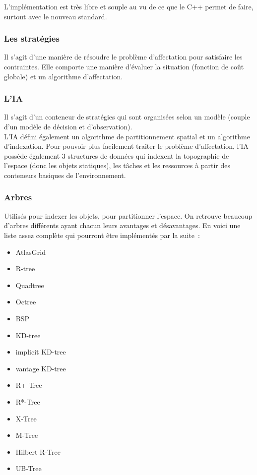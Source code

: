 L'implémentation est très libre et souple au vu de ce que le C++ permet de faire, surtout avec le nouveau standard.

\subsubsection*{Les stratégies}

Il s'agit d'une manière de résoudre le problème d'affectation pour satisfaire les contraintes. Elle comporte une manière d'évaluer la situation (fonction de coût globale) et un algorithme d'affectation.

\subsubsection*{L'IA}

Il s'agit d'un conteneur de stratégies qui sont organisées selon un modèle (couple d'un modèle de décision et d'observation).\\
L'IA défini également un algorithme de partitionnement spatial et un algorithme d'indexation.
Pour pouvoir plus facilement traiter le problème d'affectation, l'IA possède également 3 structures de données qui indexent la topographie de l'espace (donc les objets statiques), les tâches et les ressources à partir des conteneurs basiques de l'environnement.

\subsubsection*{Arbres}

Utilisés pour indexer les objets, pour partitionner l'espace. On retrouve beaucoup d'arbres différents ayant chacun leurs avantages et désavantages. En voici une liste assez complète qui pourront être implémentés par la suite~:
\begin{itemize}
\item AtlasGrid
\item R-tree
\item Quadtree
\item Octree
\item BSP
\item KD-tree
\item implicit KD-tree
\item vantage KD-tree
\item R+-Tree
\item R*-Tree
\item X-Tree
\item M-Tree
\item Hilbert R-Tree
\item UB-Tree
\end{itemize}

